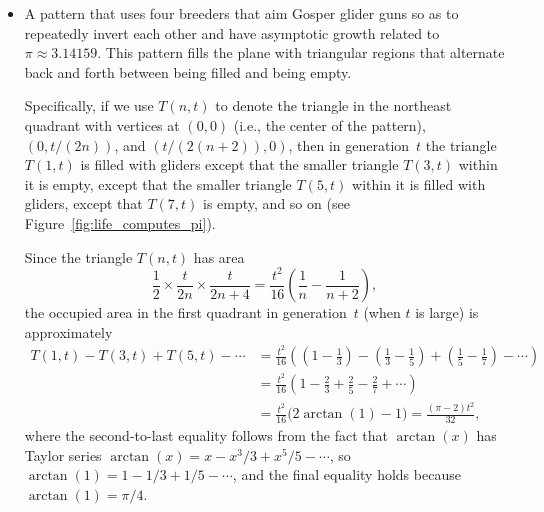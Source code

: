 \begin{itemize}
	\item A pattern that uses four breeders that aim Gosper glider guns so as to repeatedly invert each other and have asymptotic growth related to $\pi \approx 3.14159$. This pattern fills the plane with triangular regions that alternate back and forth between being filled and being empty.

	Specifically, if we use $T(n,t)$ to denote the triangle in the northeast quadrant with vertices at $(0,0)$ (i.e., the center of the pattern), $(0, t/(2n))$, and $(t/(2(n+2)), 0)$, then in generation~$t$ the triangle $T(1,t)$ is filled with gliders except that the smaller triangle $T(3,t)$ within it is empty, except that the smaller triangle $T(5,t)$ within it is filled with gliders, except that $T(7,t)$ is empty, and so on (see Figure~\ref{fig:life_computes_pi}).\bigskip
	
	\noindent\begin{minipage}{\linewidth}
		\centering{} %
		\label{fig:life_computes_pi}\bigskip
	\end{minipage}
	
	Since the triangle $T(n,t)$ has area
	\[
		\frac{1}{2} \times \frac{t}{2n} \times \frac{t}{2n+4} = \frac{t^2}{16} \left(\frac{1}{n} - \frac{1}{n+2}\right),
	\]
	the occupied area in the first quadrant in generation~$t$ (when $t$ is large) is approximately
	\begin{align*}
		T(1,t) - T(3,t) + T(5,t) - \cdots & = \frac{t^2}{16} \left( \left(1 - \frac{1}{3}\right) - \left(\frac{1}{3} - \frac{1}{5}\right) + \left(\frac{1}{5} - \frac{1}{7}\right) - \cdots\right) \\
		& = \frac{t^2}{16} \left( 1 - \frac{2}{3} + \frac{2}{5} - \frac{2}{7} + \cdots\right) \\
		& = \frac{t^2}{16}\big( 2\arctan(1) - 1\big) = \frac{(\pi-2)t^2}{32},
	\end{align*}
	where the second-to-last equality follows from the fact that $\arctan(x)$ has Taylor series $\arctan(x) = x - x^3/3 + x^5/5 - \cdots$, so $\arctan(1) = 1 - 1/3 + 1/5 - \cdots$, and the final equality holds because $\arctan(1) = \pi/4$.
	

\end{itemize}
